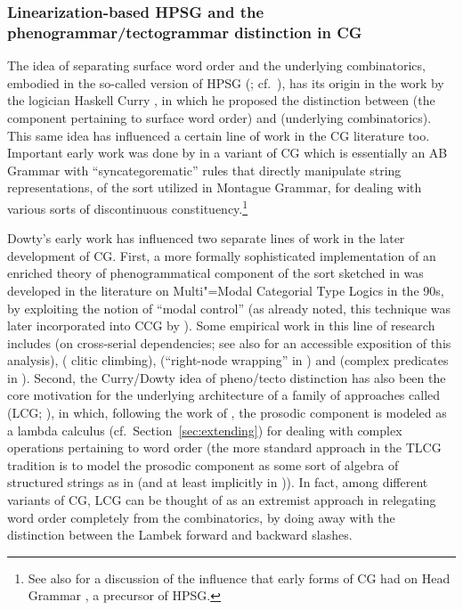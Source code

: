 \documentclass[output=paper
                ,modfonts
 	        ,biblatex
                ,babelshorthands
                ,newtxmath
                ,draftmode
                ,colorlinks, citecolor=brown
]{langscibook}
\begin{document}
\subsubsection{Linearization-based HPSG and the phenogrammar/tectogrammar distinction in CG }

The idea of separating surface word order and the underlying
combinatorics, embodied in the so-called 
version of HPSG (\citealt{Reape94a,Mueller95c,Kathol2000a};
cf.\ ), has its origin 
in the work by the logician Haskell Curry \citeyearpar{curry61}, in which he
proposed the distinction between  (the component
pertaining to surface word order) and  (underlying
combinatorics). This same idea has influenced a certain line of work
in the CG literature too. Important early work was done by
\citeauthor{Dowty82a-u} \citeyearpar{Dowty82a-u,Dowty90a-Eng} in a variant of CG which is essentially an
AB Grammar with ``syncategorematic'' rules that directly manipulate
string representations, of the sort utilized in Montague Grammar, for
dealing with various sorts of discontinuous constituency.\footnote{See
also  for a discussion of the influence
that early forms of CG \citep{Bach79a,Bach80a,Dowty82a-u,Dowty82b} had
on Head Grammar \citep{Pollard84a-u}, a precursor of HPSG.}

Dowty's early work has influenced two separate lines of work in the
later development of CG. First, a more formally sophisticated
implementation of an enriched theory of phenogrammatical component of
the sort sketched in \citet{Dowty90a-Eng} was developed in the
literature on Multi"=Modal Categorial Type Logics 
in the 90s, by exploiting the notion of ``modal control'' (as
already noted, this technique was  
later incorporated into CCG by \citealt[Chapter~5]{Baldridge2002a-u}). Some empirical
work in this line of research includes \citet{moortgatoehrle94} (on 
cross-serial dependencies; see also \citealt[Section~4]{Dowty97a-u} for an accessible
exposition of this analysis), \citet{kraak98} ( clitic climbing),
\citet{Whitman2009} (``right-node wrapping'' in ) and
\citet{kubota-diss,Kubota2014a-u} (complex predicates in ). Second,
the Curry/Dowty idea of  pheno/tecto distinction has also been the core motivation for the
underlying architecture of
a family of approaches called  (LCG;
\citealt{oehrle1994,degroote01,muskens03,mihalicek-pollard10,pollard13}),
in which, following the work of \citet{oehrle1994},
the prosodic component is modeled as a lambda calculus
(cf.\ Section~\ref{sec:extending}) for
dealing with complex operations pertaining to word order
(the more standard approach in the TLCG tradition is to model the
prosodic component as some sort of algebra of structured strings as in
\citealt{morrill-ea11} (and at least implicitly in \citealt[Section~4]{moortgat1997})). 
In fact, among different variants of  
CG, LCG can be thought of as an extremist approach in
relegating word order completely from the combinatorics, by
doing away with the distinction between the Lambek forward and backward slashes.
\end{document}
